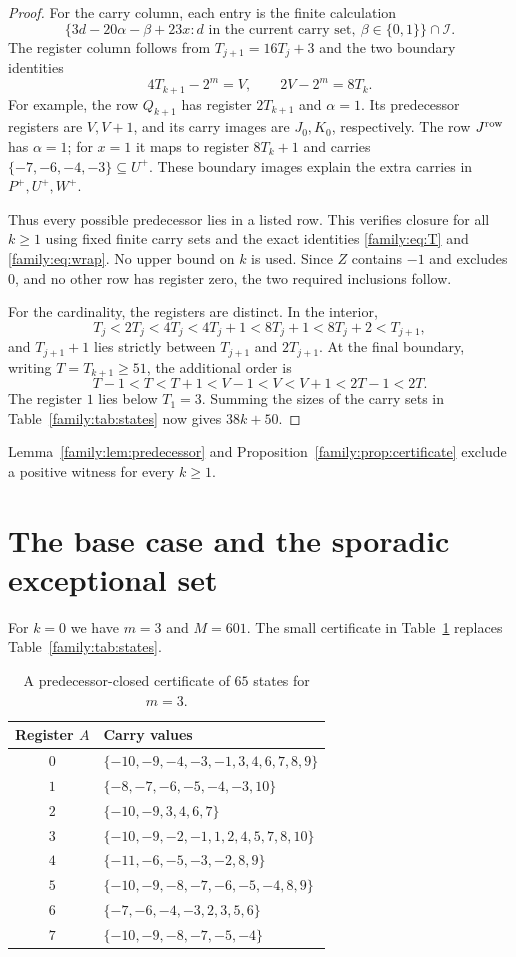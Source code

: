 \documentclass[11pt]{article}
\theoremstyle{remark}
\newcommand{\I}{\mathcal I}
\newcommand{\bits}{\{0,1\}}
\begin{document}
\begin{proof}
For the carry column, each entry is the finite calculation
\[
 \{3d-20\alpha-\beta+23x:
               d\text{ in the current carry set},\ \beta\in\bits\}
                    \cap\I.
\]
The register column follows from $T_{j+1}=16T_j+3$ and the two
boundary identities
\begin{equation}\label{family:eq:wrap}
        4T_{k+1}-2^m=V,\qquad 2V-2^m=8T_k.
\end{equation}
For example, the row $Q_{k+1}$ has register $2T_{k+1}$ and
$\alpha=1$. Its predecessor registers are $V,V+1$, and its carry
images are $J_0,K_0$, respectively. The row $J^{\rm row}$ has
$\alpha=1$; for $x=1$ it maps to register $8T_k+1$ and carries
$\{-7,-6,-4,-3\}\subseteq U^+$. These boundary images explain the
extra carries in $P^+,U^+,W^+$.

Thus every possible predecessor lies in a listed row. This verifies
closure for all $k\ge1$ using fixed finite carry sets and the exact
identities \eqref{family:eq:T} and \eqref{family:eq:wrap}. No upper bound on $k$
is used. Since $Z$ contains $-1$ and excludes $0$, and no other row
has register zero, the two required inclusions follow.

For the cardinality, the registers are distinct. In the interior,
\[
 T_j<2T_j<4T_j<4T_j+1<8T_j+1<8T_j+2<T_{j+1},
\]
and $T_{j+1}+1$ lies strictly between $T_{j+1}$ and $2T_{j+1}$.
At the final boundary, writing $T=T_{k+1}\ge51$, the additional
order is
\[
       T-1<T<T+1<V-1<V<V+1<2T-1<2T.
\]
The register $1$ lies below $T_1=3$. Summing the sizes of the carry
sets in Table~\ref{family:tab:states} now gives $38k+50$.
\end{proof}

Lemma~\ref{family:lem:predecessor} and Proposition~\ref{family:prop:certificate}
exclude a positive witness for every $k\ge1$.

\section{The base case and the sporadic exceptional set}
For $k=0$ we have $m=3$ and $M=601$. The small certificate in
Table~\ref{family:tab:base} replaces Table~\ref{family:tab:states}.

\begin{table}[htbp]
\centering\small
\caption{A predecessor-closed certificate of $65$ states for $m=3$.}
\label{family:tab:base}
\begin{tabular}{cl}
\toprule
Register $A$ & Carry values\\
\midrule
$0$ & $\{-10,-9,-4,-3,-1,3,4,6,7,8,9\}$\\
$1$ & $\{-8,-7,-6,-5,-4,-3,10\}$\\
$2$ & $\{-10,-9,3,4,6,7\}$\\
$3$ & $\{-10,-9,-2,-1,1,2,4,5,7,8,10\}$\\
$4$ & $\{-11,-6,-5,-3,-2,8,9\}$\\
$5$ & $\{-10,-9,-8,-7,-6,-5,-4,8,9\}$\\
$6$ & $\{-7,-6,-4,-3,2,3,5,6\}$\\
$7$ & $\{-10,-9,-8,-7,-5,-4\}$\\
\bottomrule
\end{tabular}
\end{table}
\end{document}
